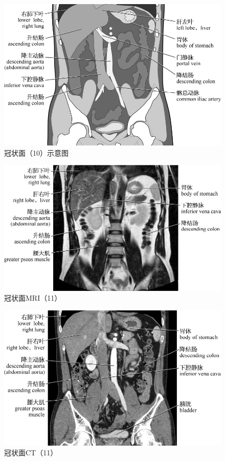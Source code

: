 \begin{figure}[!htbp]
 \centering
 \includegraphics{./images/Image00121.jpg}
 \captionsetup{justification=centering}
 \caption{冠状面（10）示意图}
  \end{figure} 
 \FloatBarrier

\begin{figure}[!htbp]
 \centering
 \includegraphics{./images/Image00122.jpg}
 \captionsetup{justification=centering}
 \caption{冠状面MRI（11）}
  \end{figure} 
 \FloatBarrier

\begin{figure}[!htbp]
 \centering
 \includegraphics{./images/Image00123.jpg}
 \captionsetup{justification=centering}
 \caption{冠状面CT（11）}
  \end{figure} 
 \FloatBarrier

